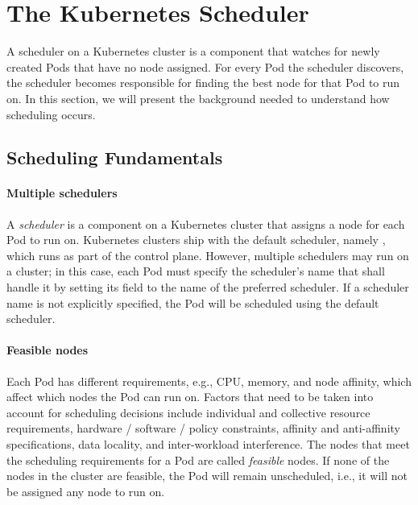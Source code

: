 \section{The Kubernetes Scheduler} \label{section:background_scheduler}

A scheduler on a Kubernetes cluster is a component that watches for newly
created Pods that have no node assigned. For every Pod the scheduler discovers,
the scheduler becomes responsible for finding the best node for that Pod to run
on. In this section, we will present the background needed to understand how
scheduling occurs.

\subsection{Scheduling Fundamentals} \label{section:scheduling-fundamentals}

\paragraph*{Multiple schedulers}

A \textit{scheduler} is a component on a Kubernetes cluster that assigns a node
for each Pod to run on. Kubernetes clusters ship with the default scheduler,
namely , which runs as part of the control plane. However,
multiple schedulers may run on a cluster; in this case, each Pod must specify
the scheduler's name that shall handle it by setting its 
field to the name of the preferred scheduler. If a scheduler name is not
explicitly specified, the Pod will be scheduled using the default scheduler.



\paragraph*{Feasible nodes}
Each Pod has different requirements, e.g., CPU, memory, and node affinity, which
affect which nodes the Pod can run on. Factors that need to be taken into
account for scheduling decisions include individual and collective resource
requirements, hardware / software / policy constraints, affinity and
anti-affinity specifications, data locality, and inter-workload interference.
The nodes that meet the scheduling requirements for a Pod are called
\textit{feasible} nodes. If none of the nodes in the cluster are feasible, the
Pod will remain unscheduled, i.e., it will not be assigned any node to run on.


